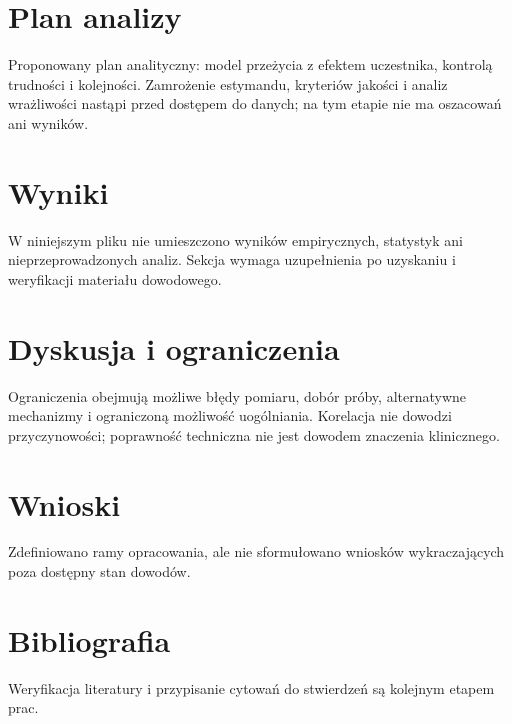 \documentclass[11pt,a4paper]{article}
\begin{document}
\section{Plan analizy}

Proponowany plan analityczny: model przeżycia z efektem uczestnika, kontrolą trudności i kolejności. Zamrożenie estymandu, kryteriów jakości i analiz wrażliwości nastąpi przed dostępem do danych; na tym etapie nie ma oszacowań ani wyników.

\section{Wyniki}

W niniejszym pliku nie umieszczono wyników empirycznych, statystyk ani nieprzeprowadzonych analiz. Sekcja wymaga uzupełnienia po uzyskaniu i weryfikacji materiału dowodowego.

\section{Dyskusja i ograniczenia}

Ograniczenia obejmują możliwe błędy pomiaru, dobór próby, alternatywne mechanizmy i ograniczoną możliwość uogólniania. Korelacja nie dowodzi przyczynowości; poprawność techniczna nie jest dowodem znaczenia klinicznego.

\section{Wnioski}

Zdefiniowano ramy opracowania, ale nie sformułowano wniosków wykraczających poza dostępny stan dowodów.

\section*{Bibliografia}

Weryfikacja literatury i przypisanie cytowań do stwierdzeń są kolejnym etapem prac.
\end{document}
